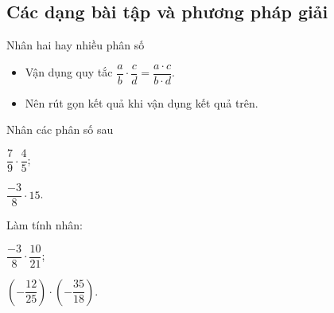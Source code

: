 \subsection{Các dạng bài tập và phương pháp giải}
\begin{dang}{Nhân hai hay nhiều phân số}
	\begin{itemize}
		\item Vận dụng quy tắc $\dfrac{a}{b}\cdot \dfrac{c}{d}=\dfrac{a\cdot c}{b\cdot d}$.
		\item \begin{note}
			Nên rút gọn kết quả khi vận dụng kết quả trên.
		\end{note}
	\end{itemize}
\end{dang}
\begin{vd}%
	Nhân các phân số sau
	\begin{enumEX}{2}
		\item $\dfrac{7}{9}\cdot \dfrac{4}{5}$;
		\item $\dfrac{-3}{8}\cdot 15$.
	\end{enumEX}
\end{vd}
\begin{vd}%
	Làm tính nhân:
	\begin{enumEX}{2}
		\item $\dfrac{-3}{8}\cdot \dfrac{10}{21}$;
		\item $\left(-\dfrac{12}{25}\right)\cdot \left(-\dfrac{35}{18}\right)$.
	\end{enumEX}
\end{vd}
